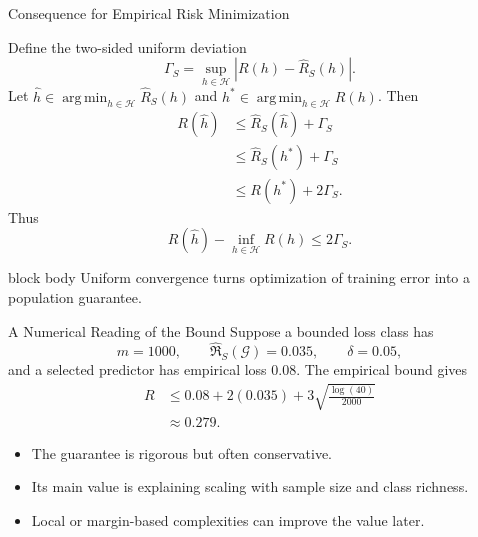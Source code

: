 \documentclass[aspectratio=169,10pt]{beamer}
\DeclareMathOperator*{\argmin}{arg\,min}
\newcommand{\Hc}{\mathcal{H}}
\newcommand{\Gc}{\mathcal{G}}
\newcommand{\Rhat}{\widehat{R}_S}
\newcommand{\RadS}{\widehat{\mathfrak{R}}_S}
\newcommand{\abs}[1]{\left\lvert #1\right\rvert}
\newcommand{\KeyBox}[1]{%
  \begin{beamercolorbox}[rounded=true,sep=0.22cm,wd=\linewidth]{block body}
    #1
  \end{beamercolorbox}%
}
\begin{document}
\begin{frame}[t]{Consequence for Empirical Risk Minimization}
  \vspace{-0.02cm}
  {\footnotesize
  Define the two-sided uniform deviation
  \[
    \Gamma_S=\sup_{h\in\Hc}\abs{R(h)-\Rhat(h)}.
  \]
  Let $\widehat h\in\argmin_{h\in\Hc}\Rhat(h)$ and
  $h^*\in\argmin_{h\in\Hc}R(h)$. Then
  \begin{align*}
    R(\widehat h)
    &\le \Rhat(\widehat h)+\Gamma_S\\
    &\le \Rhat(h^*)+\Gamma_S\\
    &\le R(h^*)+2\Gamma_S.
  \end{align*}
  Thus
  \[
    \boxed{R(\widehat h)-\inf_{h\in\Hc}R(h)\le 2\Gamma_S.}
  \]
  \KeyBox{\footnotesize Uniform convergence turns optimization of training error into a population guarantee.}}
\end{frame}

\begin{frame}[t]{A Numerical Reading of the Bound}
  \vspace{0.01cm}
  Suppose a bounded loss class has
  \[
    m=1000,\qquad \RadS(\Gc)=0.035,\qquad \delta=0.05,
  \]
  and a selected predictor has empirical loss $0.08$. The empirical bound gives
  \begin{align*}
    R
    &\le 0.08+2(0.035)
      +3\sqrt{\frac{\log(40)}{2000}}\\
    &\approx 0.279.
  \end{align*}
  \vspace{0.08cm}
  \begin{itemize}
    \setlength{\itemsep}{0.10cm}
    \item The guarantee is rigorous but often conservative.
    \item Its main value is explaining scaling with sample size and class richness.
    \item Local or margin-based complexities can improve the value later.
  \end{itemize}
\end{frame}
\end{document}
